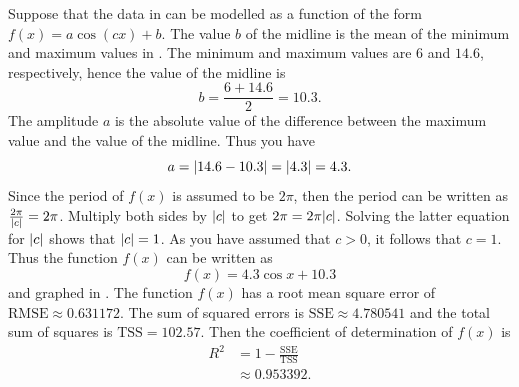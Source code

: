 \documentclass[a4paper,oneside,12pt]{article}
\begin{document}
{\begin{solution}
Suppose that the data in 
can be modelled as a function of the form $f(x) = a \cos(cx) + b$.
The value $b$ of the midline is the mean of the minimum and maximum
values in .  The minimum
and maximum values are $6$ and $14.6$, respectively, hence the value
of the midline is
\[
b
=
\frac{6 + 14.6}{2}
=
10.3.
\]
The amplitude $a$ is the absolute value of the difference between the
maximum value and the value of the midline.  Thus you have
\[
a
=
\lvert14.6 - 10.3\rvert
=
\lvert4.3\rvert
=
4.3.
\]
Since the period of $f(x)$ is assumed to be $2\pi$, then the period
can be written as $\frac{2\pi}{\lvert c\rvert} = 2\pi$.  Multiply
both sides by $\lvert c\rvert$ to get
$2\pi = 2\pi\lvert c\rvert$.  Solving the latter equation for
$\lvert c\rvert$ shows that $\lvert c\rvert = 1$.  As you have
assumed that $c > 0$, it follows that $c = 1$.  Thus the function
$f(x)$ can be written as
\begin{equation}
\label{eqn:trigonometric:mean_min_temperature_cos}
f(x)
=
4.3 \cos x + 10.3
\end{equation}
and graphed in .  The
function $f(x)$ has a root mean square error of
$\text{RMSE} \approx 0.631172$.  The sum of squared errors is
$\text{SSE} \approx 4.780541$ and the total sum of squares is
$\text{TSS} = 102.57$.  Then the coefficient of determination of
$f(x)$ is
\begin{align*}
R^2
&=
1 - \frac{\text{SSE}}{\text{TSS}} \\[4pt]
&\approx
0.953392.
\end{align*}


\end{solution}}
\end{document}
